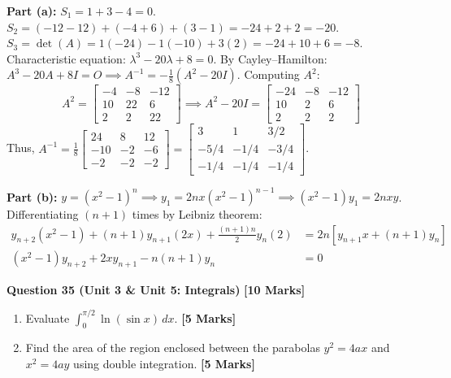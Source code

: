 \begin{solbox}
\textbf{Part (a):}
$S_1 = 1 + 3 - 4 = 0$.
$S_2 = (-12-12) + (-4+6) + (3-1) = -24 + 2 + 2 = -20$.
$S_3 = \det(A) = 1(-24) - 1(-10) + 3(2) = -24 + 10 + 6 = -8$.
Characteristic equation: $\lambda^3 - 20\lambda + 8 = 0$.
By Cayley--Hamilton: $A^3 - 20A + 8I = O \implies A^{-1} = -\frac{1}{8}(A^2 - 20I)$.
Computing $A^2$:
\begin{equation}
A^2 = \begin{bmatrix} -4 & -8 & -12 \\ 10 & 22 & 6 \\ 2 & 2 & 22 \end{bmatrix} \implies A^2 - 20I = \begin{bmatrix} -24 & -8 & -12 \\ 10 & 2 & 6 \\ 2 & 2 & 2 \end{bmatrix}
\end{equation}
Thus, $A^{-1} = \frac{1}{8}\begin{bmatrix} 24 & 8 & 12 \\ -10 & -2 & -6 \\ -2 & -2 & -2 \end{bmatrix} = \begin{bmatrix} 3 & 1 & 3/2 \\ -5/4 & -1/4 & -3/4 \\ -1/4 & -1/4 & -1/4 \end{bmatrix}$.

\textbf{Part (b):}
$y = (x^2-1)^n \implies y_1 = 2nx(x^2-1)^{n-1} \implies (x^2-1)y_1 = 2nxy$.
Differentiating $(n+1)$ times by Leibniz theorem:
\begin{align}
y_{n+2}(x^2-1) + (n+1)y_{n+1}(2x) + \frac{(n+1)n}{2}y_n(2) &= 2n[y_{n+1}x + (n+1)y_n] \\
(x^2-1)y_{n+2} + 2xy_{n+1} - n(n+1)y_n &= 0
\end{align}
\end{solbox}

\vspace{4mm}
\noindent\textbf{Question 35 (Unit 3 \& Unit 5: Integrals)} \hfill \textbf{[10 Marks]}
\begin{enumerate}[label=(\alph*),topsep=2pt,itemsep=2pt]
    \item Evaluate $\int_0^{\pi/2} \ln(\sin x)\,dx$. \hfill \textbf{[5 Marks]}
    \item Find the area of the region enclosed between the parabolas $y^2 = 4ax$ and $x^2 = 4ay$ using double integration. \hfill \textbf{[5 Marks]}
\end{enumerate}

